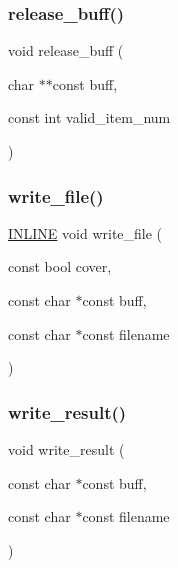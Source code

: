 \mbox{\label{_s_d_k-gcc_2cdn_2io_8cpp_adc4a454a96742f1b3dae623d8ed4c288}} 
\subsubsection{\texorpdfstring{release\+\_\+buff()}{release\_buff()}}
{\footnotesize\ttfamily void release\+\_\+buff (\begin{DoxyParamCaption}\item[{char $\ast$$\ast$const}]{buff,  }\item[{const int}]{valid\+\_\+item\+\_\+num }\end{DoxyParamCaption})}

\mbox{\label{_s_d_k-gcc_2cdn_2io_8cpp_afe2b242b1d443785861b52450c69b3ba}} 
\subsubsection{\texorpdfstring{write\+\_\+file()}{write\_file()}}
{\footnotesize\ttfamily \hyperlink{_s_d_k-gcc_2cdn_2io_8cpp_a2eb6f9e0395b47b8d5e3eeae4fe0c116}{I\+N\+L\+I\+NE} void write\+\_\+file (\begin{DoxyParamCaption}\item[{const bool}]{cover,  }\item[{const char $\ast$const}]{buff,  }\item[{const char $\ast$const}]{filename }\end{DoxyParamCaption})}

\mbox{\label{_s_d_k-gcc_2cdn_2io_8cpp_a25431423c5cb8a43c0119c62e4e120cb}} 
\subsubsection{\texorpdfstring{write\+\_\+result()}{write\_result()}}
{\footnotesize\ttfamily void write\+\_\+result (\begin{DoxyParamCaption}\item[{const char $\ast$const}]{buff,  }\item[{const char $\ast$const}]{filename }\end{DoxyParamCaption})}

